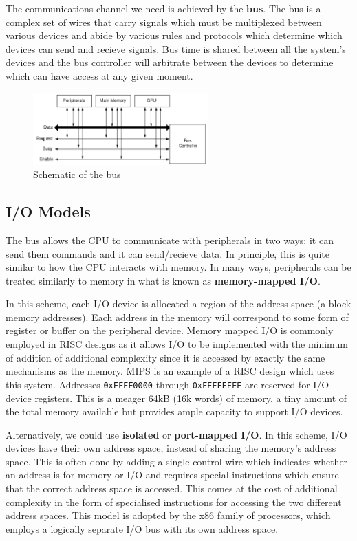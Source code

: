 \documentclass{article}
\begin{document}
	\par 
	The communications channel we need is achieved by the \textbf{bus}. The bus is a complex set of wires that carry signals which must be multiplexed between various devices and abide by various rules and protocols which determine which devices can send and recieve signals. Bus time is shared between all the system's devices and the bus controller will arbitrate between the devices to determine which can have access at any given moment.
	
	\begin{figure}[ht]
		\centering
		\includegraphics[width=0.6\textwidth]{bus_schematic}
		\caption{Schematic of the bus}
		\label{fig:bus schematic}
	\end{figure}
	
	\subsection{I/O Models}
	The bus allows the CPU to communicate with peripherals in two ways: it can send them commands and it can send/recieve data. In principle, this is quite similar to how the CPU interacts with memory. In many ways, peripherals can be treated similarly to memory in what is known as \textbf{memory-mapped I/O}.
	
	\par 
	In this scheme, each I/O device is allocated a region of the address space (a block memory addresses). Each address in the memory will correspond to some form of register or buffer on the peripheral device. Memory mapped I/O is commonly employed in RISC designs as it allows I/O to be implemented with the minimum of addition of additional complexity since it is accessed by exactly the same mechanisms as the memory. MIPS is an example of a RISC design which uses this system. Addresses \texttt{0xFFFF0000} through \texttt{0xFFFFFFFF} are reserved for I/O device registers. This is a meager 64kB (16k words) of memory, a tiny amount of the total memory available but provides ample capacity to support I/O devices.
	
	\par 
	Alternatively, we could use \textbf{isolated} or \textbf{port-mapped I/O}. In this scheme, I/O devices have their own address space, instead of sharing the memory's address space. This is often done by adding a single control wire which indicates whether an address is for memory or I/O and requires special instructions which ensure that the correct address space is accessed. This comes at the cost of additional complexity in the form of specialised instructions for accessing the two different address spaces. This model is adopted by the x86 family of processors, which employs a logically separate I/O bus with its own address space.
	
\end{document}
